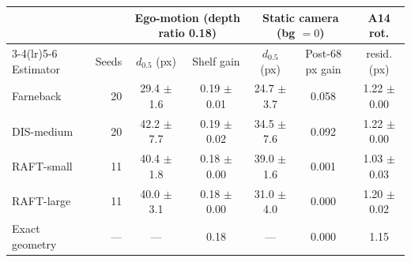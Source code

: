 \begin{tabular}{@{}lrccccc@{}}
\toprule
 & & \multicolumn{2}{c}{Ego-motion (depth ratio 0.18)} & \multicolumn{2}{c}{Static camera (bg $= 0$)} & A14 rot. \\
\cmidrule(lr){3-4}\cmidrule(lr){5-6}
Estimator & Seeds & $d_{0.5}$ (px) & Shelf gain & $d_{0.5}$ (px) & Post-68 px gain & resid. (px) \\
\midrule
Farneback & 20 & 29.4 $\pm$ 1.6 & 0.19 $\pm$ 0.01 & 24.7 $\pm$ 3.7 & 0.058 & 1.22 $\pm$ 0.00 \\
DIS-medium & 20 & 42.2 $\pm$ 7.7 & 0.19 $\pm$ 0.02 & 34.5 $\pm$ 7.6 & 0.092 & 1.22 $\pm$ 0.00 \\
RAFT-small & 11 & 40.4 $\pm$ 1.8 & 0.18 $\pm$ 0.00 & 39.0 $\pm$ 1.6 & 0.001 & 1.03 $\pm$ 0.03 \\
RAFT-large & 11 & 40.0 $\pm$ 3.1 & 0.18 $\pm$ 0.00 & 31.0 $\pm$ 4.0 & 0.000 & 1.20 $\pm$ 0.02 \\
\midrule
Exact geometry & --- & --- & 0.18 & --- & 0.000 & 1.15 \\
\bottomrule
\end{tabular}
